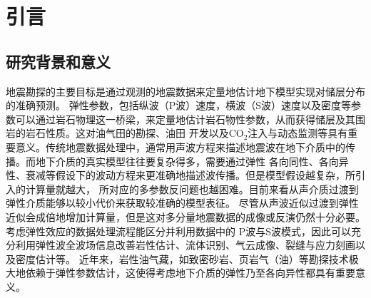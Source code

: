 \chapter{引言}
\section{研究背景和意义}
地震勘探的主要目标是通过观测的地震数据来定量地估计地下模型实现对储层分布的准确预测。
弹性参数，包括纵波（P波）速度，横波（S波）速度以及密度等参数可以通过岩石物理这一桥梁，来定量地估计岩石物性参数，从而获得储层及其围岩的岩石性质。这对油气田的勘探、油田
开发以及CO$_2$注入与动态监测等具有重要意义。传统地震数据处理中，通常用声波方程来描述地震波在地下介质中的传播。而地下介质的真实模型往往要复杂得多，需要通过弹性
各向同性、各向异性、衰减等假设下的波动方程来更准确地描述波传播。但是模型假设越复杂，所引入的计算量就越大，
所对应的多参数反问题也越困难。目前来看从声介质过渡到弹性介质能够以较小代价来获取较准确的模型表征。
尽管从声波近似过渡到弹性近似会成倍地增加计算量，但是这对多分量地震数据的成像或反演仍然十分必要。考虑弹性效应的数据处理流程能区分并利用数据中的
P波与S波模式，因此可以充分利用弹性波全波场信息改善岩性估计、流体识别、气云成像、裂缝与应力刻画以及密度估计等。
近年来，岩性油气藏，如致密砂岩、页岩气（油）等勘探技术极大地依赖于弹性参数估计，这使得考虑地下介质的弹性乃至各向异性都具有重要意义。

